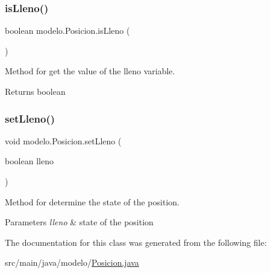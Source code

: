 \subsubsection{\texorpdfstring{is\+Lleno()}{isLleno()}}
{\footnotesize\ttfamily boolean modelo.\+Posicion.\+is\+Lleno (\begin{DoxyParamCaption}{ }\end{DoxyParamCaption})}



Method for get the value of the lleno variable. 

\begin{DoxyReturn}{Returns}
boolean 
\end{DoxyReturn}
\mbox{\label{classmodelo_1_1_posicion_a508d39b3c2031a5bbbf9bb3f6a4f3e5d}} 
\subsubsection{\texorpdfstring{set\+Lleno()}{setLleno()}}
{\footnotesize\ttfamily void modelo.\+Posicion.\+set\+Lleno (\begin{DoxyParamCaption}\item[{boolean}]{lleno }\end{DoxyParamCaption})}



Method for determine the state of the position. 


\begin{DoxyParams}{Parameters}
{\em lleno} & state of the position \\
\hline
\end{DoxyParams}


The documentation for this class was generated from the following file\+:\begin{DoxyCompactItemize}
\item 
src/main/java/modelo/\mbox{\hyperlink{_posicion_8java}{Posicion.\+java}}\end{DoxyCompactItemize}

